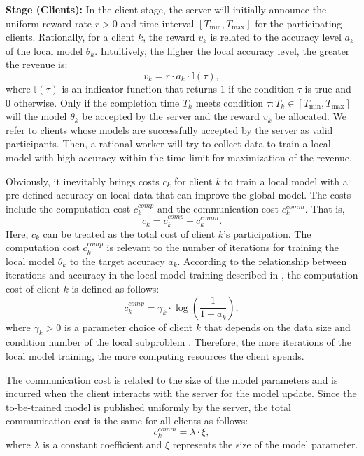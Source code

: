 \documentclass[final,1p,times]{elsarticle}
\begin{document}
\textbf{Stage \uppercase\expandafter{} (Clients):} In the client stage, the server will initially announce the uniform reward rate $r>0$ and time interval $[T_{\min},T_{\max}]$ for the participating clients. Rationally, for a client $k$, the reward $v_k$ is related to the accuracy level $a_k$ of the local model $\theta_k$. Intuitively, the higher the local accuracy level, the greater the revenue is:
\begin{equation}\label{eq:reward}
	v_k = r\cdot a_k\cdot \mathbb{I}(\tau),
\end{equation}
where $\mathbb{I}(\tau)$ is an indicator function that returns $1$ if the condition $\tau$ is true and $0$ otherwise. Only if the completion time $T_k$ meets condition $\tau: T_k\in[T_{\min},T_{\max}]$ will the model $\theta_k$ be accepted by the server and the reward $v_k$ be allocated. We refer to clients whose models are successfully accepted by the server as valid participants. Then, a rational worker will try to collect data to train a local model with high accuracy within the time limit for maximization of the revenue.  

Obviously, it inevitably brings costs $c_k$ for client $k$ to train a local model with a pre-defined accuracy on local data that can improve the global model. The costs include the computation cost $c_k^{comp}$ and the communication cost $c_k^{comm}$. That is, 
\begin{equation}\label{eq:cost}
	c_k	= c_k^{comp} + c_k^{comm}.
\end{equation}
Here, $c_k$ can be treated as the total cost of client $k$'s participation. The computation cost $c_k^{comp}$ is relevant to the number of iterations for training the local model $\theta_k$ to the target accuracy $a_k$. According to the relationship between iterations and accuracy in the local model training described in \citep{pandey2020crowdsourcing}, the computation cost of client $k$ is defined as follows:
\begin{equation}
	c_k^{comp} = \gamma_k\cdot \log(\frac{1}{1-a_k}),
\end{equation}
where $\gamma_k>0$ is a parameter choice of client $k$ that depends on the data size and condition number of the local subproblem \citep{konevcny2017semi}. Therefore, the more iterations of the local model training, the more computing resources the client spends.

The communication cost is related to the size of the model parameters and is incurred when the client interacts with the server for the model update. Since the to-be-trained model is published uniformly by the server, the total communication cost is the same for all clients as follows:
\begin{equation}
	c_k^{comm} = \lambda\cdot\xi,
\end{equation}
where $\lambda$ is a constant coefficient and $\xi$ represents the size of the model parameter.
\end{document}
